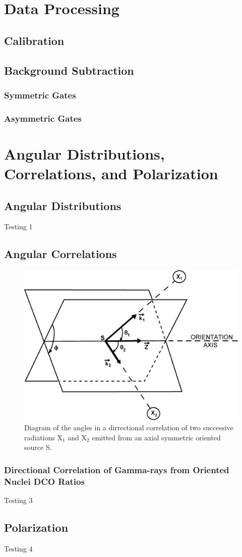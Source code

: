 \section{Data Processing}
\label{sec:exp-pr-data-proc}
\subsection{Calibration}
\label{ssec:exp-pr-data-proc-cal}
\subsection{Background Subtraction}
\label{ssec:exp-pr-data-proc-bg-sub}
\subsubsection{Symmetric Gates}
\label{sssec:exp-pr-data-proc-bg-sub-sym}
\subsubsection{Asymmetric Gates}
\label{sssec:exp-pr-data-proc-bg-sub-asym}

\section{Angular Distributions, Correlations, and Polarization}
\label{sec:exp-pr-data-ang}
\subsection{Angular Distributions}
\label{ssec:exp-pr-data-ang-dist}
Testing 1
\subsection{Angular Correlations}
\label{ssec:exp-pr-data-ang-cor}
\begin{figure}[h!]
	\centerline{\includegraphics[height=0.35\textheight]{./img/c3/dco_setup.eps}}
	\caption{Diagram of the angles in a dirrectional correlation of two successive radiations X$_{1}$ and X$_{2}$ emitted from an axial symmetric oriented source S.}
	\label{fig:chp3-DCO-Angles}
\end{figure}
\subsubsection{Directional Correlation of Gamma-rays from Oriented Nuclei DCO Ratios}
\label{sssec:exp-pr-data-ang-cor-dco}
Testing 3
\subsection{Polarization}
\label{ssec:exp-pr-data-ang-pol}
Testing 4
